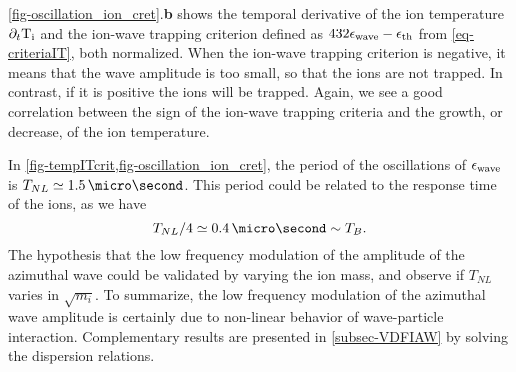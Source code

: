     \cref{fig-oscillation_ion_cret}.{\bf b} shows the temporal derivative of the ion temperature $\partial_t \mathrm{T_i}$ and the ion-wave trapping criterion defined as $432\epsilon_{\rm wave} - \epsilon_{\rm th}$ from \cref{eq-criteriaIT}, both normalized.
    When the ion-wave trapping criterion is negative, it means that the wave amplitude is too small, so that the ions are not trapped.
    In contrast, if it is positive the ions will be trapped.
    Again, we see a good correlation between the sign of the ion-wave trapping criteria and the growth, or decrease, of the ion temperature.
    
    In \cref{fig-tempITcrit,fig-oscillation_ion_cret}, the period of the oscillations of $\epsilon_{\rm wave}$ is $T_{NL} \simeq 1.5\,\micro\second$.
    This period could be related to the response time of the ions, as we have \citep{weiland1977} $$T_{NL}/4 \simeq 0.4\,\micro\second \sim T_B.$$
    The hypothesis that the low frequency modulation of the amplitude of the azimuthal wave could be validated by varying the ion mass, and observe if $T_{NL}$ varies in $\sqrt{m_i}$.    
    To summarize, the low frequency modulation of the azimuthal wave amplitude is certainly due to non-linear behavior of wave-particle interaction.
    Complementary results are presented in \cref{subsec-VDFIAW} by solving the dispersion relations.
    
